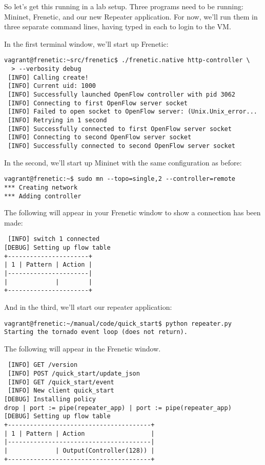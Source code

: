 So let's get this running in a lab setup.  
Three programs need to be running:  Mininet, Frenetic, and our new Repeater application.  
For now, we'll run them in three separate command lines, having typed  in each
to login to the VM.

In the first terminal window, we'll start up Frenetic:

\begin{verbatim}
vagrant@frenetic:~src/frenetic$ ./frenetic.native http-controller \
  > --verbosity debug
 [INFO] Calling create!
 [INFO] Current uid: 1000
 [INFO] Successfully launched OpenFlow controller with pid 3062
 [INFO] Connecting to first OpenFlow server socket
 [INFO] Failed to open socket to OpenFlow server: (Unix.Unix_error...
 [INFO] Retrying in 1 second
 [INFO] Successfully connected to first OpenFlow server socket
 [INFO] Connecting to second OpenFlow server socket
 [INFO] Successfully connected to second OpenFlow server socket 
\end{verbatim}

In the second, we'll start up Mininet with the same configuration as before:

\begin{verbatim}
vagrant@frenetic:~$ sudo mn --topo=single,2 --controller=remote
*** Creating network
*** Adding controller
\end{verbatim}

The following will appear in your Frenetic window to show a connection has been made:

\begin{verbatim}
 [INFO] switch 1 connected
[DEBUG] Setting up flow table
+----------------------+
| 1 | Pattern | Action |
|----------------------|
|             |        |
+----------------------+
\end{verbatim}

And in the third, we'll start our repeater application:

\begin{verbatim}
vagrant@frenetic:~/manual/code/quick_start$ python repeater.py
Starting the tornado event loop (does not return).
\end{verbatim}

The following will appear in the Frenetic window.  

\begin{verbatim}
 [INFO] GET /version
 [INFO] POST /quick_start/update_json
 [INFO] GET /quick_start/event
 [INFO] New client quick_start
[DEBUG] Installing policy
drop | port := pipe(repeater_app) | port := pipe(repeater_app)
[DEBUG] Setting up flow table
+---------------------------------------+
| 1 | Pattern | Action                  |
|---------------------------------------|
|             | Output(Controller(128)) |
+---------------------------------------+
\end{verbatim}

